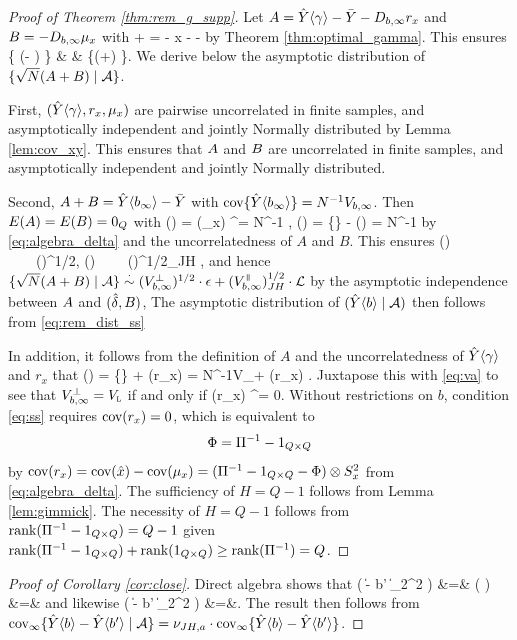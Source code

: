 \documentclass[11pt]{article}
\theoremstyle{definition}
\begin{document}
\begin{proof}[Proof of Theorem \ref{thm:rem_g_supp}]
Let $A  = \hat Y\langle\gamma\rangle - \bar Y - D_{b, \infty} r_x$ and $B  = - D_{b, \infty} \mu_x$ with 
\beginy\label{eq:AB}
\rb  + \mub =  \hyg  - \dbi \hat x - \by  \approxi   \hyba- \by
\endy
by Theorem \ref{thm:optimal_gamma}. This ensures
\beginy
 \{ \sqrtn (\hyba- \by) \mid \ma\} & \asim& \{\sqrtn (\rb +\mub ) \mid \ma\}.  \label{eq:rem_dist_ss}
\endy
We derive below the asymptotic distribution of $\{ \sqrt N(A +B ) \mid \mathcal{A}\}$. 

First, $(\hat Y\langle\gamma\rangle, r_x, \mu_x)$ are pairwise uncorrelated in finite samples, and asymptotically independent and jointly Normally distributed by Lemma \ref{lem:cov_xy}. 
This ensures that $A $ and $ B $ are uncorrelated in finite samples, and asymptotically independent and jointly Normally distributed. 

Second, $A+B = \hat Y\langle b_\infty \rangle  - \bar Y$ with $\text{cov}\{\hat Y\langle b_\infty \rangle\} = N^{-1}V_{b,\infty}$.
Then $E(A ) =E(B ) = 0_Q$ with  
\beginy\label{eq:va}
\cov(\mub )  = \dbi  \cov(\mu_x) \dbi ^\T= N^{-1} \vpbi, \quad  \cov(\rb ) = \cov\{\hybi\} - \cov(\mub ) = N^{-1} \vrbi
\endy
by \eqref{eq:algebra_delta} and the uncorrelatedness of $A$ and $B$.
This ensures
\begina
(\sqrtn \rb  \mid \ma) \ \  \asim \ \  (\vrbi)^{1/2}\cdot   \epsilon,  \qquad 
(\sqrtn \mub  \mid \ma) \ \ \asim  \ \   (\vpbi)^{1/2}_{JH} \cdot \mL,
\enda
and hence 
$
 \{ \sqrtn (\rb  + \mub ) \mid \ma \}  \asim   (\vrbi)^{1/2}\cdot   \epsilon + (\vpbi)^{1/2}_{JH} \cdot \mL$ by the asymptotic independence between $A $ and $(\hat\delta, B )$, 
The asymptotic distribution of $(\hat Y\langle b \rangle\mid \mathcal{A})$ then follows from \eqref{eq:rem_dist_ss}

In addition, it follows from the definition of $A$ and the uncorrelatedness of $\hat Y\langle\gamma\rangle$ and $r_x$ that
\begina
\cov(\rb ) = \cov\{\hyg\} + \dbi \cov(r_x) \dbi = N^{-1}V_\lin + \dbi \cov(r_x) \dbi.
\enda
Juxtapose this with \eqref{eq:va} to see that $V^{\perp}_{b,\infty} = V_{\textsc{l}}$ if and only if  
\beginy\label{eq:ss}
\dbi \cov(r_x) \dbi^\T  = 0.\endy
%
%
Without restrictions on $b$, condition \eqref{eq:ss} requires $\text{cov}(r_x) = 0$, which is equivalent to $$\Phi = \Pi ^{-1}-1_{Q\times Q}$$ by 
$
\text{cov}(r_x) = \text{cov}(\hat x) - \text{cov}(\mu_x) =  (\Pi ^{-1}-1_{Q\times Q} - \Phi )\otimes S^2_{x}$ from \eqref{eq:algebra_delta}. 
The sufficiency of $H = Q-1$ follows from Lemma \ref{lem:gimmick}.
The necessity of $H =Q-1$ follows from $ \textup{rank}(\Pi ^{-1}-1_{Q\times Q}) = Q-1$ given $\textup{rank}(\Pi ^{-1}-1_{Q\times Q}) + \textup{rank}(1_{Q\times Q}) \geq \textup{rank}(\Pi ^{-1}) = Q$. 
\end{proof}


\begin{proof}[Proof of Corollary \ref{cor:close}] 
Direct algebra shows that
\begina
  \ei \big( \|\hyba - \hy\la b' \ra \|_2^2   \big)
&=&
 \ei \left( \tr{} \right)\\
&=&
   \tr  {}
\enda
and likewise 
\begina
   \ei \big( \|\hyba - \hy\la b' \ra \|_2^2  \mid \ma \big) &=&\tr {}.
 \enda
 The result then follows from    
$ \text{cov}_\infty \{\hat Y\langle b \rangle - \hat Y\langle b' \rangle  \mid \mathcal{A}\} = \nu_{JH,a}\cdot \text{cov}_\infty  \{\hat Y\langle b \rangle - \hat Y\langle b' \rangle  \}$.
\end{proof}
\end{document}
